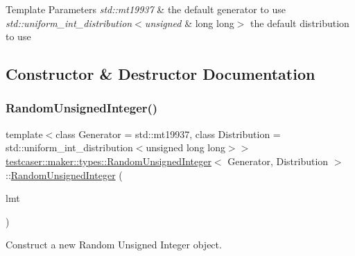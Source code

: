 \begin{DoxyTemplParams}{Template Parameters}
{\em std\+::mt19937} & the default generator to use \\
\hline
{\em std\+::uniform\+\_\+int\+\_\+distribution$<$unsigned} & long long$>$ the default distribution to use \\
\hline
\end{DoxyTemplParams}


\subsection{Constructor \& Destructor Documentation}
\mbox{\label{classtestcaser_1_1maker_1_1types_1_1RandomUnsignedInteger_a9f4184392f1842553d062f2d0f668ae2}} 
\subsubsection{\texorpdfstring{Random\+Unsigned\+Integer()}{RandomUnsignedInteger()}\hspace{0.1cm}{\footnotesize\ttfamily [1/2]}}
{\footnotesize\ttfamily template$<$class Generator = std\+::mt19937, class Distribution = std\+::uniform\+\_\+int\+\_\+distribution$<$unsigned long long$>$$>$ \\
\hyperlink{classtestcaser_1_1maker_1_1types_1_1RandomUnsignedInteger}{testcaser\+::maker\+::types\+::\+Random\+Unsigned\+Integer}$<$ Generator, Distribution $>$\+::\hyperlink{classtestcaser_1_1maker_1_1types_1_1RandomUnsignedInteger}{Random\+Unsigned\+Integer} (\begin{DoxyParamCaption}\item[{\hyperlink{classtestcaser_1_1maker_1_1RandomUnsignedIntegerLimit}{testcaser\+::maker\+::\+Random\+Unsigned\+Integer\+Limit}}]{lmt }\end{DoxyParamCaption})\hspace{0.3cm}{\ttfamily [inline]}}



Construct a new Random Unsigned Integer object. 


